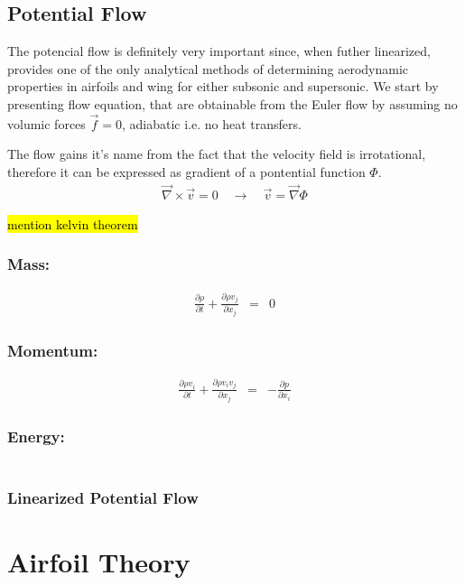 \newpage
\section{Potential Flow}
The potencial flow is definitely very important since, when futher linearized, provides one of the only analytical methods of determining aerodynamic properties in airfoils and wing for either subsonic and supersonic.
We start by presenting flow equation, that are obtainable from the Euler flow by assuming no volumic forces $\vec{f}=0$, adiabatic i.e. no heat transfers.

The flow gains it's name from the fact that the velocity field is irrotational, therefore it can be expressed as gradient of a pontential function $\Phi$.
\begin{eqnarray}
    \vec{\nabla}\times \vec{v} = 0   \quad \rightarrow \quad  \vec{v}=\vec{\nabla} \Phi
\end{eqnarray}

\hl{mention kelvin theorem}
\subsection*{Mass:}
\begin{eqnarray}
    \frac{\partial \rho}{\partial t} +  \frac{\partial \rho v_j}{\partial x_j} &=& 0
\end{eqnarray}

\subsection*{Momentum:}
\begin{eqnarray}
    \frac{\partial \rho v_i}{\partial t} +  \frac{\partial \rho v_i v_j}{\partial x_j} &=& - \frac{\partial p}{\partial x_i}
\end{eqnarray}

\subsection*{Energy:}
\begin{eqnarray}
\end{eqnarray}


\subsection{Linearized Potential Flow}




\newpage
\chapter{Airfoil Theory}



